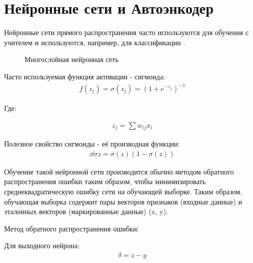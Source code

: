\documentclass[12pt]{article}
\begin{document}
\section{Нейронные сети и Автоэнкодер}

Нейронные сети прямого распространения часто используются для обучения с учителем и используются, например, для классификации \cite{Stanford1}.

  \begin{figure}[H]
    \noindent{}
    \caption{Многослойная нейронная сеть}
    \label{figCurves}
  \end{figure}

Часто используемая функция активации - сигмоида:
  \begin{align}
	f(z_j)=\sigma(z_j)=(1+e^{-z_j})^{-1}
  \end{align}

Где:

  \begin{align}
	z_j=\sum{{w_{ij}}{x_i}}
  \end{align}

Полезное свойство сигмоиды - её производная функции:
  \begin{align}
	\dd{\sigma}z=\sigma(z)(1-\sigma(z))
  \end{align}

Обучение такой нейронной сети производится обычно методом обратного распространения ошибки таким образом, чтобы минимизировать среднеквадратическую ошибку сети на обучающей выборке. Таким образом, обучающая выборка содержит пары векторов признаков (входные данные) и эталонных векторов (маркированные данные) {(x, y)}.

Метод обратного распространения ошибки:

Для выходного нейрона:
  \begin{align}
	\delta=z-y
  \end{align}
\end{document}
